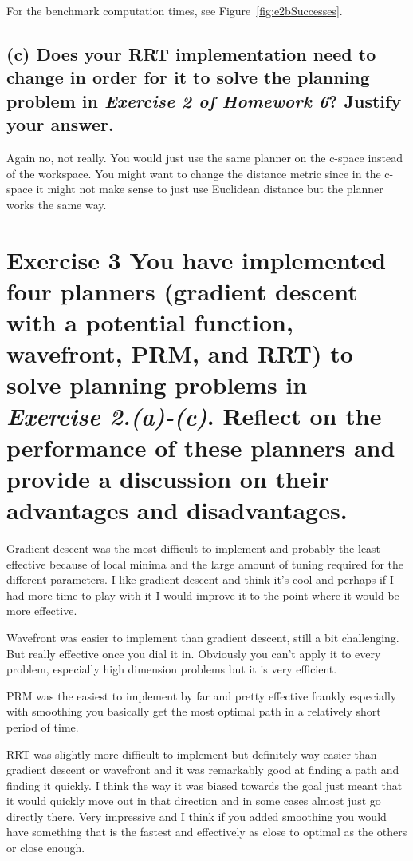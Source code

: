 \documentclass{article}
\begin{document}
For the benchmark computation times, see Figure~\ref{fig:e2bSuccesses}.

\subsection*{(c)
Does your RRT implementation need to change in order for it to solve the planning problem in \textit{Exercise 2 of Homework 6}? Justify your answer.
}

Again no, not really. You would just use the same planner on the c-space instead of the workspace. You might want to change the distance metric since in the c-space it might not make sense to just use Euclidean distance but the planner works the same way.

\section*{Exercise 3
You have implemented four planners (gradient descent with a potential function, wavefront, PRM, and RRT) to solve planning problems in \textit{Exercise 2.(a)-(c)}. Reflect on the performance of these planners and provide a discussion on their advantages and disadvantages.
}

Gradient descent was the most difficult to implement and probably the least effective because of local minima and the large amount of tuning required for the different parameters.
I like gradient descent and think it's cool and perhaps if I had more time to play with it I would improve it to the point where it would be more effective.

Wavefront was easier to implement than gradient descent, still a bit challenging. But really effective once you dial it in. Obviously you can't apply it to every problem, especially high dimension problems but it is very efficient.

PRM was the easiest to implement by far and pretty effective frankly especially with smoothing you basically get the most optimal path in a relatively short period of time.

RRT was slightly more difficult to implement but definitely way easier than gradient descent or wavefront and it was remarkably good at finding a path and finding it quickly.
I think the way it was biased towards the goal just meant that it would quickly move out in that direction and in some cases almost just go directly there.
Very impressive and I think if you added smoothing you would have something that is the fastest and effectively as close to optimal as the others or close enough.
\end{document}
